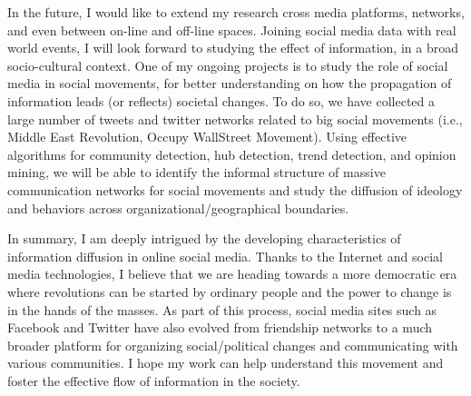 \documentclass[phd,tocprelim]{cornell}
\begin{document}
In the future, I would like to extend my research cross media platforms, networks, and even between on-line and off-line spaces. Joining social media data with real world events, I will look forward to studying the effect of information, in a broad socio-cultural context. One of my ongoing projects is to study the role of social media in social movements, for better understanding on how the propagation of information leads (or reflects) societal changes. To do so, we have collected a large number of tweets and twitter networks related to big social movements (i.e., Middle East Revolution, Occupy WallStreet Movement). Using effective algorithms for community detection, hub detection, trend detection, and opinion
mining, we will be able to identify the informal structure of massive communication networks
for social movements and study the diffusion of ideology and behaviors across organizational/geographical boundaries.

In summary, I am deeply intrigued by the developing characteristics of information diffusion in online social media. Thanks to the Internet and social media technologies, I believe that we are heading towards a more democratic era where revolutions can be started by ordinary people and the power to change is in the hands of the masses. As part of this process, social media sites such as Facebook and Twitter have also evolved from friendship networks to a much broader platform for organizing social/political changes and communicating with various communities. I hope my work can help understand this movement and foster the effective flow of information in the society.




\end{document}
